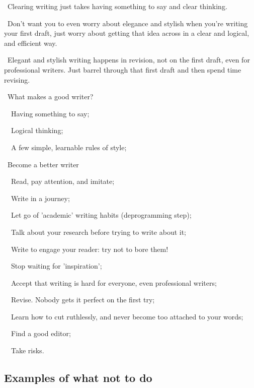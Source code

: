\documentclass[a4paper, 12pt]{article}
\begin{document}
\par\textbullet\ Clearing writing just takes having something to say and clear thinking.

\par\textbullet\ Don't want you to even worry about elegance and stylish when you're writing your first draft, just worry about getting that idea across in a clear and logical, and efficient way.

\par\textbullet\ Elegant and stylish writing happens in revision, not on the first draft, even for professional writers. Just barrel through that first draft and then spend time revising.

\par\textbullet\ What makes a good writer?
\par\ \textopenbullet\ Having something to say;
\par\ \textopenbullet\ Logical thinking;
\par\ \textopenbullet\ A few simple, learnable rules of style;

\par\textbullet\ Become a better writer
\par\ \textopenbullet\ Read, pay attention, and imitate;
\par\ \textopenbullet\ Write in a journey;
\par\ \textopenbullet\ Let go of 'academic' writing habits (deprogramming step);
\par\ \textopenbullet\ Talk about your research before trying to write about it;
\par\ \textopenbullet\ Write to engage your reader: try not to bore them!
\par\ \textopenbullet\ Stop waiting for 'inspiration';
\par\ \textopenbullet\ Accept that writing is hard for everyone, even professional writers;
\par\ \textopenbullet\ Revise. Nobody gets it perfect on the first try;
\par\ \textopenbullet\ Learn how to cut ruthlessly, and never become too attached to your words;
\par\ \textopenbullet\ Find a good editor;
\par\ \textopenbullet\ Take risks.

\subsection{Examples of what not to do}
\end{document}
